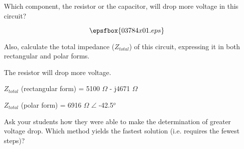 

Which component, the resistor or the capacitor, will drop more voltage in this circuit?

$$\epsfbox{03784x01.eps}$$

Also, calculate the total impedance ($Z_{total}$) of this circuit, expressing it in both rectangular and polar forms.







The resistor will drop more voltage.

\vskip 10pt

$Z_{total}$ (rectangular form) = 5100 $\Omega$ - j4671 $\Omega$

\vskip 10pt

$Z_{total}$ (polar form) = 6916 $\Omega$ $\angle$ -42.5$^{o}$







Ask your students how they were able to make the determination of greater voltage drop.  Which method yields the fastest solution (i.e. requires the fewest steps)?




